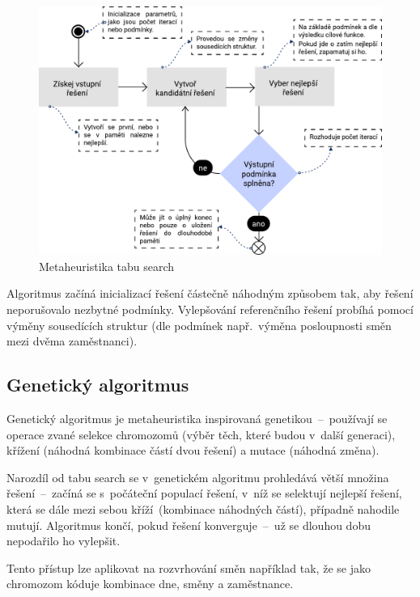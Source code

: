 \documentclass[a4paper,11pt,openany,twoside]{book}
\begin{document}
\begin{figure}[h]
	\centering
	\includegraphics[scale=0.7]{img/tabu-search.pdf}
	\caption{Metaheuristika tabu search}
	\label{fig:tabusearch}
\end{figure}

 Algoritmus začíná inicializací řešení částečně náhodným způsobem tak, aby řešení neporušovalo nezbytné podmínky. Vylepšování referenčního řešení probíhá pomocí výměny sousedících struktur (dle podmínek např.~výměna posloupnosti směn mezi dvěma zaměstnanci). \cite{ramli2020tabu}

\subsection{Genetický algoritmus}

Genetický algoritmus je metaheuristika inspirovaná genetikou~--~používají se operace zvané selekce chromozomů (výběr těch, které budou v~další generaci), křížení (náhodná kombinace částí dvou řešení) a mutace (náhodná změna).

Narozdíl od tabu search se v~genetickém algoritmu prohledává větší množina řešení~–~začíná se s~počáteční populací řešení, v~níž se selektují nejlepší řešení, která se dále mezi sebou kříží~(kombinace náhodných částí), případně nahodile mutují. Algoritmus končí, pokud řešení konverguje~–~už se dlouhou dobu nepodařilo ho vylepšit. \cite{mallawaarachchi2017introduction}

Tento přístup lze aplikovat na rozvrhování směn například tak, že se jako chromozom kóduje kombinace dne, směny a zaměstnance. \cite{maenhout2011evolutionary}
\end{document}
